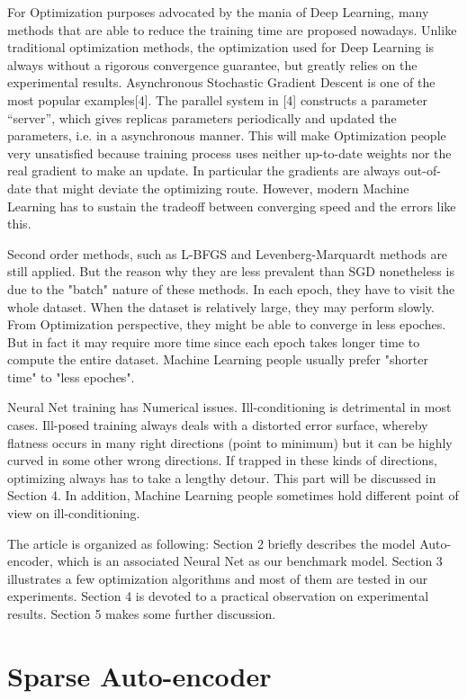 \documentclass{article} %
\begin{document}
For Optimization purposes advocated by the mania of Deep Learning, many methods that are
able to reduce the training time are proposed nowadays. Unlike traditional optimization methods, the optimization used for Deep Learning is always without a rigorous convergence guarantee, but greatly relies on the experimental results. Asynchronous Stochastic Gradient Descent is one of the most popular examples[4]. The parallel system in [4] constructs a parameter “server”, which gives replicas parameters
periodically and updated the parameters, i.e. in a asynchronous manner. This will make Optimization people very unsatisfied because training process uses neither up-to-date weights nor the real gradient to make an update. In particular the gradients are always out-of-date that might deviate the optimizing route. However, modern Machine Learning has to sustain the tradeoff between converging speed and the errors like this.

Second order methods, such as L-BFGS and Levenberg-Marquardt methods are still applied. But the reason why they are less prevalent than SGD nonetheless is due to the "batch" nature of these methods. In each epoch, they have to visit the whole dataset. When the dataset is relatively large, they may perform slowly. From Optimization perspective, they might be able to converge in less epoches. But in fact it may require more time since each epoch takes longer time to compute the entire dataset. Machine Learning people usually prefer "shorter time" to "less epoches".

Neural Net training has Numerical issues. Ill-conditioning is detrimental in most cases. Ill-posed training always deals with a distorted error surface, whereby flatness occurs in many right directions (point to minimum) but it can be highly curved in some other wrong directions. If trapped in these kinds of directions, optimizing always has to take a lengthy detour. This part will be discussed in Section 4. In addition, Machine Learning people sometimes hold different point of view on ill-conditioning.

The article is organized as following: Section 2 briefly describes the model Auto-encoder, which is an associated Neural Net as our benchmark model. Section 3 illustrates a few optimization algorithms and most of them are tested in our experiments. Section 4 is devoted to a practical observation on experimental results. Section 5 makes some further discussion.


\section{Sparse Auto-encoder}
\end{document}
